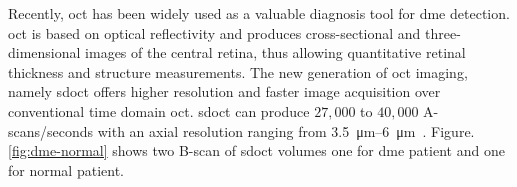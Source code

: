 Recently, \ac{oct} has been widely used as a valuable diagnosis tool for \ac{dme} detection.
\ac{oct} is based on optical reflectivity and produces cross-sectional and three-dimensional images of the central retina, thus allowing quantitative retinal thickness and structure measurements.
The new generation of \ac{oct} imaging, namely \ac{sdoct} offers higher resolution and faster image acquisition over conventional time domain \ac{oct}. \Ac{sdoct} can produce $27,000$ to $40,000$ A-scans/seconds with an axial resolution ranging from \SIrange{3.5}{6}{\micro \metre}~\cite{Chen2005}. 
Figure.\,\ref{fig:dme-normal} shows two B-scan of \ac{sdoct} volumes one for \ac{dme} patient and one for normal patient.
\begin{figure}
\begin{center}
\

\end{center}
\end{figure}
